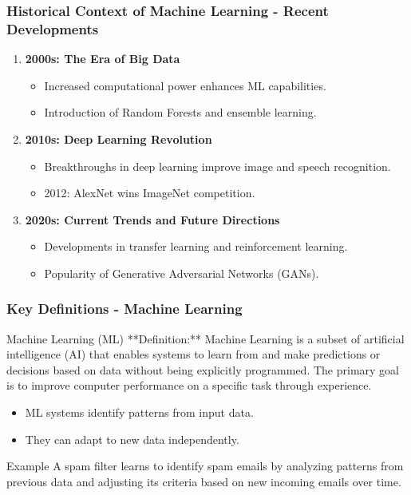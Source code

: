 \documentclass[aspectratio=169]{beamer}
\begin{document}
\begin{frame}[fragile]
    \frametitle{Historical Context of Machine Learning - Recent Developments}
    \begin{enumerate}
        \item \textbf{2000s: The Era of Big Data}
            \begin{itemize}
                \item Increased computational power enhances ML capabilities.
                \item Introduction of Random Forests and ensemble learning.
            \end{itemize}
        \item \textbf{2010s: Deep Learning Revolution}
            \begin{itemize}
                \item Breakthroughs in deep learning improve image and speech recognition.
                \item 2012: AlexNet wins ImageNet competition.
            \end{itemize}
        \item \textbf{2020s: Current Trends and Future Directions}
            \begin{itemize}
                \item Developments in transfer learning and reinforcement learning.
                \item Popularity of Generative Adversarial Networks (GANs).
            \end{itemize}
    \end{enumerate}
\end{frame}

\begin{frame}[fragile]
    \frametitle{Key Definitions - Machine Learning}
    \begin{block}{Machine Learning (ML)}
        **Definition:**  
        Machine Learning is a subset of artificial intelligence (AI) that enables systems to learn from and make predictions or decisions based on data without being explicitly programmed. The primary goal is to improve computer performance on a specific task through experience.
    \end{block}
    \begin{itemize}
        \item ML systems identify patterns from input data.
        \item They can adapt to new data independently.
    \end{itemize}
    \begin{block}{Example}
        A spam filter learns to identify spam emails by analyzing patterns from previous data and adjusting its criteria based on new incoming emails over time.
    \end{block}
\end{frame}
\end{document}
